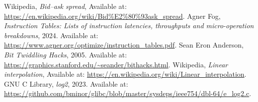 \documentclass[11pt]{article}
\begin{document}
\begin{thebibliography}{9}

Wikipedia, \textit{Bid–ask spread}, Available at: \url{https://en.wikipedia.org/wiki/Bid%E2%80%93ask_spread}.
Agner Fog, \textit{Instruction Tables: Lists of instruction latencies, throughputs and micro-operation breakdowns}, 2024. Available at: \url{https://www.agner.org/optimize/instruction_tables.pdf}.
Sean Eron Anderson, \textit{Bit Twiddling Hacks}, 2005. Available at: \url{https://graphics.stanford.edu/~seander/bithacks.html}.
Wikipedia, \textit{Linear interpolation}, Available at: \url{https://en.wikipedia.org/wiki/Linear_interpolation}.
GNU C Library, \textit{log2}, 2023. Available at: \url{https://github.com/bminor/glibc/blob/master/sysdeps/ieee754/dbl-64/e_log2.c}.

\end{thebibliography}
\end{document}
